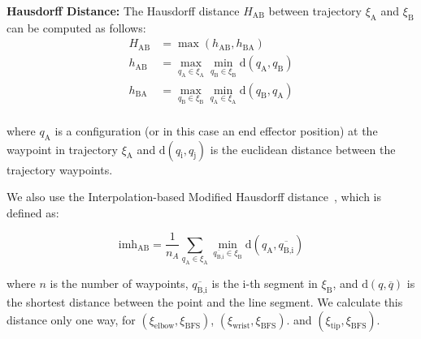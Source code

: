 \documentclass[letterpaper, 10 pt, conference]{ieeeconf}  %
\newcommand{\tj}[1]{\ensuremath{\xi_\text{#1}}}
\begin{document}



{\bf Hausdorff Distance:}
The Hausdorff distance $H_\text{AB}$ between trajectory $\xi_\text{A}$ and $\xi_\text{B}$ can be computed as follows:
\begin{equation}
\begin{aligned}
H_\text{AB} &= \max (h_{\text{AB}}, h_{\text{BA}}) \\
h_{\text{AB}} &= \max_{q_\text{A} \in \xi_\text{A}} \min_{q_\text{B} \in \xi_\text{B}} \text{d}(q_\text{A}, q_\text{B})\\
h_{\text{BA}} &= \max_{q_\text{B} \in \xi_\text{B}} \min_{q_\text{A} \in \xi_\text{A}} \text{d}(q_\text{B}, q_\text{A})\\
\end{aligned}
\end{equation}

where $q_\text{A}$ is a configuration (or in this case an end effector position) at the waypoint in trajectory \tj{A} and $\text{d}(q_\text{i}, q_\text{j})$ is the euclidean distance between the trajectory waypoints.

We also use the Interpolation-based Modified Hausdorff distance~\cite{dubuisson1994modified}, which is defined as:

\begin{equation}
\text{imh}_\text{AB} = \frac{1}{n_A} \sum_{q_\text{A} \in \xi_\text{A}} \min_{\overline{q_\text{B,i}} \in \xi_\text{B}} \text{d}(q_\text{A}, \overline{q_\text{B,i}})
\end{equation}

where $n$ is the number of waypoints, $\overline{q_\text{B,i}}$ is the i-th segment in \tj{B}, and $\text{d}(q, \overline{q})$ is the shortest distance between the point and the line segment. We calculate this distance only one way, for $(\tj{elbow},\tj{BFS})$, $(\tj{wrist},\tj{BFS})$. and $(\tj{tip},\tj{BFS})$.
\end{document}
